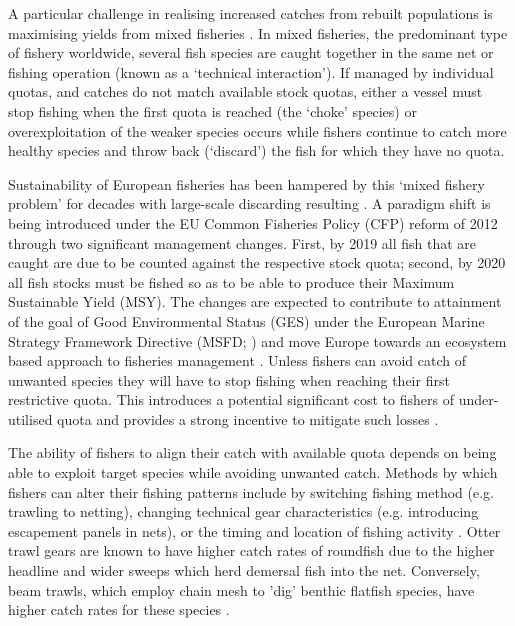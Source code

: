 \documentclass{nature}
\begin{document}
\begin{linenumbers}
A particular challenge in realising increased catches from rebuilt populations
is maximising yields from mixed fisheries \cite{Branch2008, Kuriyama2016,
	Ulrich2016}. In mixed fisheries, the predominant type
of fishery worldwide, several fish species are caught together in the same net
or fishing operation (known as a `technical interaction'). If managed by
individual quotas, and catches do not match available stock quotas, either a
vessel must stop fishing when the first quota is reached (the `choke' species)
or overexploitation of the weaker species occurs while fishers continue to
catch more healthy species and throw back (`discard') the fish for which they
have no quota.

Sustainability of European fisheries has been hampered by this `mixed fishery
problem' for decades with large-scale discarding resulting \cite{Borges2015,
	Uhlmann2014}.  A paradigm shift is being introduced under the EU Common
Fisheries Policy (CFP) reform of 2012 through two significant management
changes.  First, by 2019 all fish that are caught are due to be counted against
the respective stock quota; second, by 2020 all fish stocks must be fished so
as to be able to produce their Maximum Sustainable Yield
(MSY)\cite{EuropeanParliamentandCounciloftheEuropeanUnion2013}. The changes are
expected to contribute to attainment of the goal of Good Environmental Status
(GES) under the European Marine Strategy Framework Directive (MSFD;
\cite{EuropeanParliament2008}) and move Europe towards an ecosystem based
approach to fisheries management \cite{Garcia2003}. Unless fishers can avoid
catch of unwanted species they will have to stop fishing when reaching their
first restrictive quota. This introduces a potential significant cost to
fishers of under-utilised quota\cite{Hoff2010a, Ulrich2016} and provides a
strong incentive to mitigate such losses \cite{Condie2013, Condie2013a}. 

The ability of fishers to align their catch with available quota depends on
being able to exploit target species while avoiding unwanted catch. Methods by
which fishers can alter their fishing patterns include by switching fishing
method (e.g. trawling to netting), changing technical gear characteristics
(e.g.  introducing escapement panels in nets), or the timing and location of
fishing activity \cite{Fulton2011b, vanPutten2012a}. Otter trawl gears are
known to have higher catch rates of roundfish due to the higher headline and
wider sweeps which herd demersal fish into the net. Conversely, beam trawls,
which employ chain mesh to 'dig' benthic flatfish species, have higher catch
rates for these species \cite{Fraser2008}.


\end{linenumbers}
\end{document}

